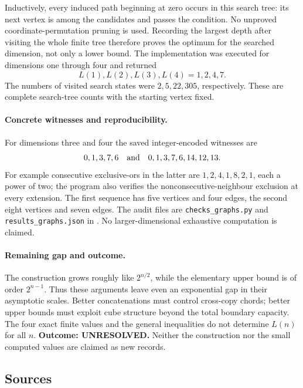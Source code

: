 \documentclass[11pt,a4paper]{article}
\begin{document}
Inductively, every induced path beginning at zero occurs in this search
tree: its next vertex is among the candidates and passes the condition.
No unproved coordinate-permutation pruning is used. Recording the
largest depth after visiting the whole finite tree therefore proves
the optimum for the searched dimension, not only a lower bound.
The implementation was executed for dimensions one through four and
returned
\[
                            L(1),L(2),L(3),L(4)=1,2,4,7.
\]
The numbers of visited search states were $2,5,22,305$, respectively.
These are complete search-tree counts with the starting vertex fixed.

\paragraph{Concrete witnesses and reproducibility.}
For dimensions three and four the saved integer-encoded witnesses are
\[
                 0,1,3,7,6
                 \quad\hbox{and}\quad
                 0,1,3,7,6,14,12,13.
\]
For example consecutive exclusive-ors in the latter are
$1,2,4,1,8,2,1$, each a power of two; the program also verifies the
nonconsecutive-neighbour exclusion at every extension. The first
sequence has five vertices and four edges, the second eight vertices
and seven edges. The audit files are \texttt{checks\_graphs.py} and
\texttt{results\_graphs.json} in
.
No larger-dimensional exhaustive computation is claimed.

\paragraph{Remaining gap and outcome.}
The construction grows roughly like $2^{n/2}$, while the elementary
upper bound is of order $2^{n-1}$. Thus these arguments leave even an
exponential gap in their asymptotic scales. Better concatenations must
control cross-copy chords; better upper bounds must exploit cube
structure beyond the total boundary capacity. The four exact finite
values and the general inequalities do not determine $L(n)$ for all
$n$. \textbf{Outcome: UNRESOLVED.} Neither the construction nor the
small computed values are claimed as new records.

\subsection{Sources}
\end{document}
